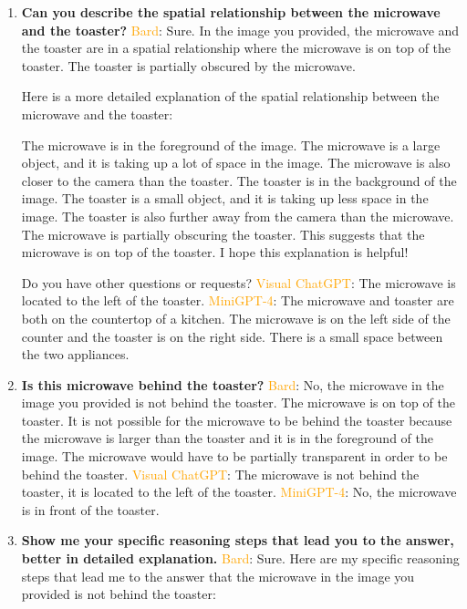 \begin{enumerate}
    \item \textbf{Can you describe the spatial relationship between the microwave and the toaster?}
    \subitem \textcolor{orange}{Bard}: Sure. In the image you provided, the microwave and the toaster are in a spatial relationship where the microwave is on top of the toaster. The toaster is partially obscured by the microwave.

    Here is a more detailed explanation of the spatial relationship between the microwave and the toaster:
    
    The microwave is in the foreground of the image. The microwave is a large object, and it is taking up a lot of space in the image. The microwave is also closer to the camera than the toaster.
    The toaster is in the background of the image. The toaster is a small object, and it is taking up less space in the image. The toaster is also further away from the camera than the microwave.
    The microwave is partially obscuring the toaster. This suggests that the microwave is on top of the toaster.
    I hope this explanation is helpful!
    
    Do you have other questions or requests?
    \subitem \textcolor{orange}{Visual ChatGPT}: The microwave is located to the left of the toaster.
    \subitem \textcolor{orange}{MiniGPT-4}: The microwave and toaster are both on the countertop of a kitchen. The microwave is on the left side of the counter and the toaster is on the right side. There is a small space between the two appliances.
    \item \textbf{Is this microwave behind the toaster?}
    \subitem \textcolor{orange}{Bard}: 
    No, the microwave in the image you provided is not behind the toaster. The microwave is on top of the toaster. It is not possible for the microwave to be behind the toaster because the microwave is larger than the toaster and it is in the foreground of the image. The microwave would have to be partially transparent in order to be behind the toaster.
    \subitem \textcolor{orange}{Visual ChatGPT}: The microwave is not behind the toaster, it is located to the left of the toaster.
    \subitem \textcolor{orange}{MiniGPT-4}: No, the microwave is in front of the toaster.
    \item \textbf{Show me your specific reasoning steps that lead you to the answer, better in detailed explanation.}
    \subitem \textcolor{orange}{Bard}: 
    Sure. Here are my specific reasoning steps that lead me to the answer that the microwave in the image you provided is not behind the toaster:


\end{enumerate}
